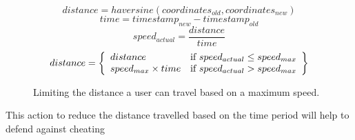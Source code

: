 \begin{figure}[h]
\begin{equation}
  distance = haversine(coordinates_{old}, coordinates_{new})
\end{equation}
\begin{equation}
  time = timestamp_{new} - timestamp_{old}
\end{equation}
\begin{equation}
  speed_{actual} = \frac{distance}{time}
\end{equation}
\begin{equation}
  distance = \left\{
  \begin{array}{l l}
    distance & \text{if $speed_{actual} \leq speed_{max}$} \\
    speed_{max} \times time & \text{if $speed_{actual} > speed_{max} $}
  \end{array}
  \right\}
\end{equation}
\caption{Limiting the distance a user can travel based on a maximum speed.}
\label{fig:distance_limit}
\end{figure}

This action to reduce the distance travelled based on the time period
will help to defend against cheating



